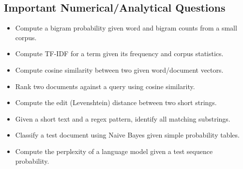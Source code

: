 \documentclass[11pt,a4paper]{article}
\begin{document}
\subsection{Important Numerical/Analytical Questions}
\begin{itemize}[leftmargin=*]
  \item Compute a bigram probability given word and bigram counts from a small corpus.
  \item Compute TF-IDF for a term given its frequency and corpus statistics.
  \item Compute cosine similarity between two given word/document vectors.
  \item Rank two documents against a query using cosine similarity.
  \item Compute the edit (Levenshtein) distance between two short strings.
  \item Given a short text and a regex pattern, identify all matching substrings.
  \item Classify a test document using Naive Bayes given simple probability tables.
  \item Compute the perplexity of a language model given a test sequence probability.
\end{itemize}
\end{document}
